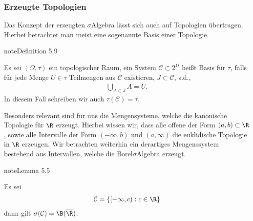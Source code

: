 \documentclass[letterpaper,10pt,german]{jupyterBook}
\begin{document}
\subsubsection{Erzeugte Topologien}
\label{\detokenize{masstheorie/masstheorie:erzeugte-topologien}}\label{\detokenize{masstheorie/masstheorie:s-gentop}}
\sphinxAtStartPar
Das Konzept der erzeugten \(\sigma\)\sphinxhyphen{}Algebra lässt sich auch auf Topologien übertragen. Hierbei betrachtet man meist eine sogenannte Basis einer Topologie.
\label{masstheorie/masstheorie:definition-17}
\begin{sphinxadmonition}{note}{Definition 5.9}



\sphinxAtStartPar
Es sei \((\Omega,\tau)\) ein topologischer Raum, ein System \(\mathcal{C}\subset 2^\Omega\) heißt Basis für \(\tau\), falls für jede Menge \(U\in\tau\) Teilmengen aus \(\mathcal{C}\) existieren, \(J\subset\mathcal{C}\), s.d.,
\begin{equation*}
\begin{split}\bigcup_{A\in J} A = U.\end{split}
\end{equation*}
\sphinxAtStartPar
In diesem Fall schreiben wir auch \(\tau(\mathcal{C})=\tau\).
\end{sphinxadmonition}

\sphinxAtStartPar
Besonders relevant sind für uns die Mengensysteme, welche die kanonische Topologie für \(\R\) erzeugt. Hierbei wissen wir, dass alle offene  der Form \((a,b)\subset \R\), sowie alle Intervalle der Form \((-\infty, b)\) und \((a, \infty)\) die euklidische Topologie in \(\R\) erzeugen. Wir betrachten weiterhin ein derartiges Mengenssystem bestehend aus Intervallen, welche die Borel\sphinxhyphen{}\(\sigma\)\sphinxhyphen{}Algebra erzeugt.
\label{masstheorie/masstheorie:lem:genborel}
\begin{sphinxadmonition}{note}{Lemma 5.5}



\sphinxAtStartPar
Es sei
\begin{equation*}
\begin{split}\mathcal{C} = \{ [-\infty, c):c\in\R\}\end{split}
\end{equation*}
\sphinxAtStartPar
dann gilt \(\sigma(\mathcal{C}) = \B(\overline{\R})\).
\end{sphinxadmonition}
\end{document}
